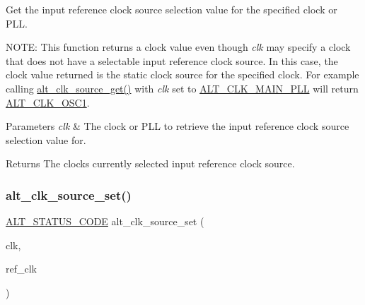 Get the input reference clock source selection value for the specified clock or P\+LL.

N\+O\+TE\+: This function returns a clock value even though {\itshape clk} may specify a clock that does not have a selectable input reference clock source. In this case, the clock value returned is the static clock source for the specified clock. For example calling \mbox{\hyperlink{group__CLK__MGR__CLK__SEL_gaf739ec1ec11ec5d218eac1ce9e2d0406}{alt\+\_\+clk\+\_\+source\+\_\+get()}} with {\itshape clk} set to \mbox{\hyperlink{group__CLK__MGR_gga931510957187a22cb4e6adef8d9d105aa7d46a872d96624605073ef8806987cd2}{A\+L\+T\+\_\+\+C\+L\+K\+\_\+\+M\+A\+I\+N\+\_\+\+P\+LL}} will return \mbox{\hyperlink{group__CLK__MGR_gga931510957187a22cb4e6adef8d9d105aa04437147392f88c0d6fcdfe38cec087c}{A\+L\+T\+\_\+\+C\+L\+K\+\_\+\+O\+S\+C1}}.


\begin{DoxyParams}{Parameters}
{\em clk} & The clock or P\+LL to retrieve the input reference clock source selection value for.\\
\hline
\end{DoxyParams}
\begin{DoxyReturn}{Returns}
The clock\textquotesingle{}s currently selected input reference clock source. 
\end{DoxyReturn}
\mbox{\label{group__CLK__MGR__CLK__SEL_ga8eacc262142e216056ec1f0130d75d6f}} 
\subsubsection{\texorpdfstring{alt\_clk\_source\_set()}{alt\_clk\_source\_set()}}
{\footnotesize\ttfamily \mbox{\hyperlink{hwlib_8h_abdb0d369f069723ca55d6c94bcaaaa12}{A\+L\+T\+\_\+\+S\+T\+A\+T\+U\+S\+\_\+\+C\+O\+DE}} alt\+\_\+clk\+\_\+source\+\_\+set (\begin{DoxyParamCaption}\item[{\mbox{\hyperlink{group__CLK__MGR_ga4cdb80e84284365fe3d47c2f8050b13d}{A\+L\+T\+\_\+\+C\+L\+K\+\_\+t}}}]{clk,  }\item[{\mbox{\hyperlink{group__CLK__MGR_ga4cdb80e84284365fe3d47c2f8050b13d}{A\+L\+T\+\_\+\+C\+L\+K\+\_\+t}}}]{ref\+\_\+clk }\end{DoxyParamCaption})}

